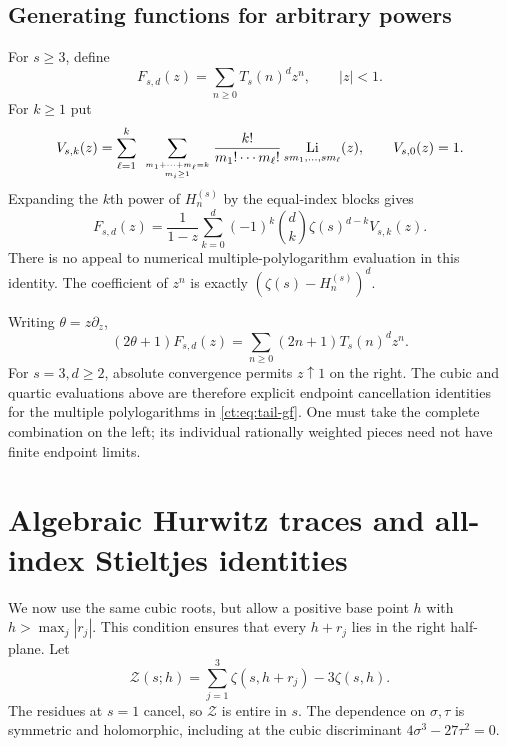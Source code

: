 \documentclass[11pt]{article}
\numberwithin{equation}{section}
\theoremstyle{definition}\newtheorem{definition}[theorem]{Definition}
\theoremstyle{remark}\newtheorem{remark}[theorem]{Remark}
\DeclareMathOperator{\Li}{Li}
\newcommand{\Ztr}{\mathcal Z}
\begin{document}
\subsection{Generating functions for arbitrary powers}
For $s\ge3$, define
\[
 F_{s,d}(z)=\sum_{n\ge0}T_s(n)^d z^n,\qquad |z|<1.
\]
For $k\ge1$ put
\[
 V_{s,k}(z)=\sum_{\ell=1}^k\ 
       \sum_{m_1+\cdots+m_\ell=k\atop m_i\ge1}
       \frac{k!}{m_1!\cdots m_\ell!}
             \Li_{sm_1,\ldots,sm_\ell}(z),
 \qquad V_{s,0}(z)=1.
\]
Expanding the $k$th power of $H_n^{(s)}$ by the equal-index blocks gives
\begin{equation}\label{ct:eq:tail-gf}
 F_{s,d}(z)=\frac1{1-z}
      \sum_{k=0}^d(-1)^k\binom dk\zeta(s)^{d-k}V_{s,k}(z).
\end{equation}
There is no appeal to numerical multiple-polylogarithm evaluation in this
identity. The coefficient of $z^n$ is exactly
$(\zeta(s)-H_n^{(s)})^d$.

Writing $\theta=z\partial_z$,
\begin{equation}\label{ct:eq:weighted-gf}
 (2\theta+1)F_{s,d}(z)=\sum_{n\ge0}(2n+1)T_s(n)^d z^n.
\end{equation}
For $s=3,d\ge2$, absolute convergence permits $z\uparrow1$ on the
right. The cubic and quartic evaluations above are therefore explicit
endpoint cancellation identities for the multiple polylogarithms in
\eqref{ct:eq:tail-gf}. One must take the complete combination on the left;
its individual rationally weighted pieces need not have finite endpoint
limits.

\section{Algebraic Hurwitz traces and all-index Stieltjes identities}
\label{ct:sec:stieltjes}
We now use the same cubic roots, but allow a positive base point $h$ with
$h>\max_j|r_j|$. This condition ensures that every $h+r_j$ lies in the
right half-plane. Let
\begin{equation}\label{ct:eq:trace}
 \Ztr(s;h)=\sum_{j=1}^3\zeta(s,h+r_j)-3\zeta(s,h).
\end{equation}
The residues at $s=1$ cancel, so $\Ztr$ is entire in $s$.
The dependence on $\sigma,\tau$ is symmetric and holomorphic, including
at the cubic discriminant $4\sigma^3-27\tau^2=0$.
\end{document}
